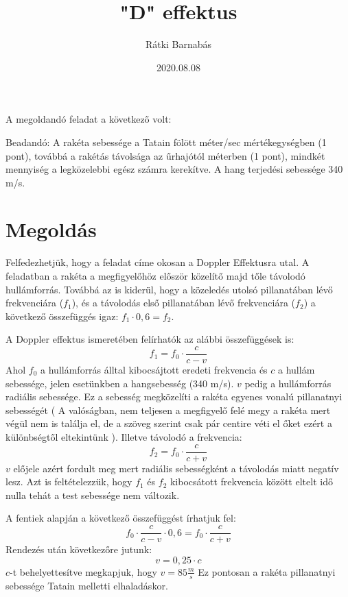 \documentclass{article}[12pt,a4paper]
\title{"D" effektus}
\author{Rátki Barnabás}
\date{2020.08.08}
\begin{document}
\maketitle

A megoldandó feladat a következő volt: 
\begin{displayquote}
Beadandó: A rakéta sebessége a Tatain fölött méter/sec mértékegységben (1 pont), továbbá a rakétás távolsága az űrhajótól méterben (1 pont), mindkét mennyiség a legközelebbi egész számra kerekítve. A hang terjedési sebessége 340 m/s. 
\end{displayquote}

\section{Megoldás}
Felfedezhetjük, hogy a feladat címe okosan a Doppler Effektusra utal. A feladatban a rakéta a megfigyelőhöz először közelítő majd tőle távolodó hullámforrás. Továbbá az is kiderül, hogy a közeledés utolsó pillanatában lévő frekvenciára ($f_1$), és a távolodás első pillanatában lévő frekvenciára ($f_2$) a következő összefüggés igaz: $f_1 \cdot 0,6 = f_2$.\par
A Doppler effektus ismeretében felírhatók az alábbi összefüggések is: $$f_1 = f_0\cdot\frac{c}{c-v}$$ Ahol $f_0$ a hullámforrás álltal kibocsájtott eredeti frekvencia és $c$ a hullám sebessége, jelen esetünkben a hangsebesség (340 m/s). $v$ pedig a hullámforrás radiális sebessége. Ez a sebesség megközelíti a rakéta egyenes vonalú pillanatnyi sebességét ( A valóságban, nem teljesen a megfigyelő felé megy a rakéta mert végül nem is találja el, de a szöveg szerint csak pár centire véti el őket ezért a különbségtől eltekintünk ). Illetve távolodó a frekvencia: $$f_2 = f_0\cdot\frac{c}{c+v}$$ $v$ előjele azért fordult meg mert radiális sebességként a távolodás miatt negatív lesz. Azt is feltételezzük, hogy $f_1$ és $f_2$ kibocsátott frekvencia között eltelt idő nulla tehát a test sebessége nem változik.\par
A fentiek alapján a következő összefüggést írhatjuk fel: $$f_0\cdot\frac{c}{c-v} \cdot 0,6 = f_0\cdot\frac{c}{c+v}$$ Rendezés után következőre jutunk: $$v = 0,25\cdot c$$ $c$-t behelyettesítve megkapjuk, hogy $v = 85 \frac{m}{s}$ Ez pontosan a rakéta pillanatnyi sebessége Tatain melletti elhaladáskor.
\end{document}
